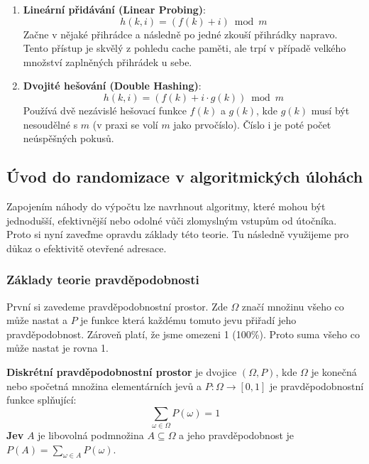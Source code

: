 \begin{enumerate}
    \item \textbf{Lineární přidávání (Linear Probing)}:
    $$h(k, i) = (f(k) + i) \bmod m$$
    Začne v nějaké přihrádce a následně po jedné zkouší přihrádky napravo. Tento přístup je skvělý z pohledu cache paměti, ale trpí v případě velkého množství zaplněných přihrádek u sebe.
    
    \item \textbf{Dvojité hešování (Double Hashing)}:
    $$h(k, i) = (f(k) + i \cdot g(k)) \bmod m$$
    Používá dvě nezávislé hešovací funkce $f(k)$ a $g(k)$, kde $g(k)$ musí být nesoudělné s $m$ (v praxi se volí $m$ jako prvočíslo). Číslo i je poté počet neúspěšných pokusů.
\end{enumerate}

\bigskip

\newpage

\subsection{Úvod do randomizace v algoritmických úlohách}

Zapojením náhody do výpočtu lze navrhnout algoritmy, které mohou být jednodušší, efektivnější nebo odolné vůči zlomyslným vstupům od útočníka. Proto si nyní zaveďme opravdu základy této teorie. Tu následně využijeme pro důkaz o efektivitě otevřené adresace.

\subsubsection{Základy teorie pravděpodobnosti}

První si zavedeme pravděpodobnostní prostor. Zde $\Omega$ značí množinu všeho co může nastat a $P$ je funkce která každému tomuto jevu přiřadí jeho pravděpodobnost. Zároveň platí, že jsme omezeni 1 (100\%). Proto suma všeho co může nastat je rovna 1.

\medskip

\begin{definition}
\textbf{Diskrétní pravděpodobnostní prostor} je dvojice $(\Omega, P)$, kde $\Omega$ je konečná nebo spočetná množina elementárních jevů a $P: \Omega \to [0, 1]$ je pravděpodobnostní funkce splňující:
$$\sum_{\omega \in \Omega} P(\omega) = 1$$
\textbf{Jev} $A$ je libovolná podmnožina $A \subseteq \Omega$ a jeho pravděpodobnost je $P(A) = \sum_{\omega \in A} P(\omega)$.
\end{definition}

